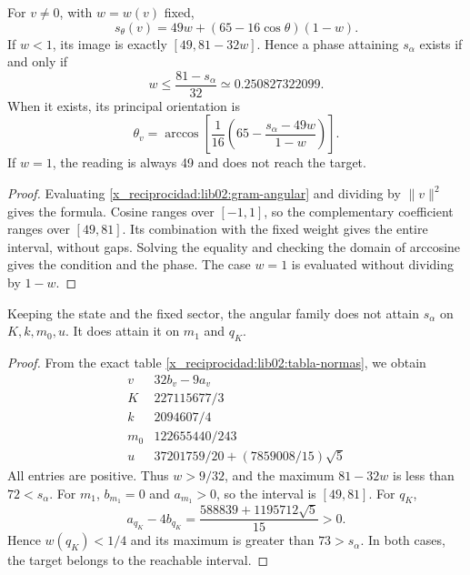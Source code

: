 \begin{proposition}
\label{x_reciprocidad:lib02:alcanzabilidad}
For \(v\ne0\), with \(w=w(v)\) fixed,
\[
 s_\theta(v)=49w+(65-16\cos\theta)(1-w).
\]
If \(w<1\), its image is exactly \([49,81-32w]\). Hence a phase attaining \(s_\alpha\) exists if and only if
\[
 w\leq\frac{81-s_\alpha}{32}\simeq0.250827322099.
\]
When it exists, its principal orientation is
\[
 \theta_v=\arccos\left[
 \frac1{16}\left(65-\frac{s_\alpha-49w}{1-w}\right)\right].
\]
If \(w=1\), the reading is always 49 and does not reach the target.
\end{proposition}
\begin{proof}
Evaluating \eqref{x_reciprocidad:lib02:gram-angular} and dividing by \(\|v\|^2\) gives the formula. Cosine ranges over \([-1,1]\), so the complementary coefficient ranges over \([49,81]\). Its combination with the fixed weight gives the entire interval, without gaps. Solving the equality and checking the domain of arccosine gives the condition and the phase. The case \(w=1\) is evaluated without dividing by \(1-w\).
\end{proof}

\begin{corollary}
\label{x_reciprocidad:lib02:seis-angulares}
Keeping the state and the fixed sector, the angular family does not attain
\(s_\alpha\) on \(K,k,m_0,u\). It does attain it on
\(m_1\) and \(q_K\).
\end{corollary}
\begin{proof}
From the exact table \eqref{x_reciprocidad:lib02:tabla-normas}, we obtain
\[
\begin{array}{c|c}
 v&32b_v-9a_v\\\hline
 K&227115677/3\\
 k&2094607/4\\
 m_0&122655440/243\\
 u&37201759/20+(7859008/15)\sqrt5
\end{array}
\]
All entries are positive. Thus \(w>9/32\), and the maximum \(81-32w\) is less than \(72<s_\alpha\). For \(m_1\), \(b_{m_1}=0\) and \(a_{m_1}>0\), so the interval is \([49,81]\). For \(q_K\),
\[
 a_{q_K}-4b_{q_K}=\frac{588839+1195712\sqrt5}{15}>0.
\]
Hence \(w(q_K)<1/4\) and its maximum is greater than \(73>s_\alpha\). In both cases, the target belongs to the reachable interval.
\end{proof}


